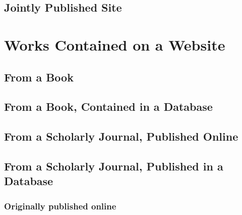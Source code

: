 \documentclass{article}
\begin{document}
\subsection{Jointly Published Site} %
\label{sub:jointly_published_site}
\begin{refsection}
	\nocite{Manifold:aa}
	\printbibliography[heading=none]
\end{refsection}

\section{Works Contained on a Website} %
\label{sec:works_contained_on_a_website}
\subsection{From a Book} %
\label{sub:from_a_book}
\begin{refsection}
	\nocite{Poe:1902aa}
	\printbibliography[heading=none]
\end{refsection}
\subsection{From a Book, Contained in a Database} %
\label{sub:from_a_book_contained_in_a_database}
\begin{refsection}
	\nocite{Toorn:2017ti}
	\printbibliography[heading=none]
\end{refsection}
\subsection{From a Scholarly Journal, Published Online} %
\label{sub:from_a_scholarly_journal_published_online}
\begin{refsection}
	\nocite{Fisek:te}
	\printbibliography[heading=none]
\end{refsection}
\subsection{From a Scholarly Journal, Published in a Database} %
\label{sub:from_a_scholarly_journal_published_in_a_database}
\subsubsection{Originally published online} %
\label{ssub:originally_published_online}
\begin{refsection}
	\nocite{Chan:uj}
	\printbibliography[heading=none]
\end{refsection}
\end{document}
